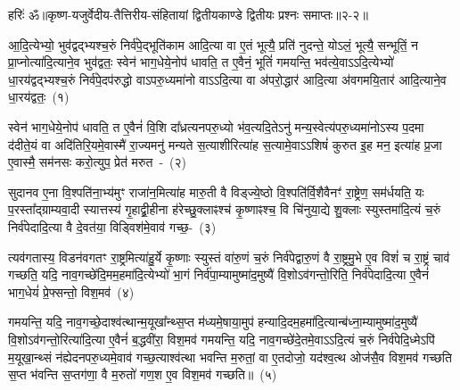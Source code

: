 {\anuvakamend[जि॒नोषि॑ देभुः॒ प्र ह॒व्यं ब॒भूथ॒ मा याभि॑श्चत्वारि॒ꣳ॒शच्च॑]}

{हरिः॑ ॐ}{॥कृष्ण-यजुर्वेदीय-तैत्तिरीय-संहितायां द्वितीयकाण्डे द्वितीयः प्रश्नः समाप्तः॥२-२॥}

\setcounter{anuvakam}{0}
आ॒दि॒त्येभ्यो॒ भुव॑द्वद्भ्यश्च॒रुं निर्व॑पे॒द्भूति॑काम आदि॒त्या वा ए॒तं भूत्यै॒ प्रति॑ नुदन्ते॒ यो\-ऽलं॒ भूत्यै॒ सन्भूतिं॒ न प्रा॒प्नोत्या॑दि॒त्याने॒व भुव॑द्वतः॒ स्वेन॑ भाग॒धेये॒नोप॑ धावति॒ त ए॒वैनं॒ भूतिं॑ गमयन्ति॒ भव॑त्ये॒वा\-ऽऽ\-दि॒त्येभ्यो॑ धा॒रय॑द्वद्भ्यश्च॒रुं निर्व॑पे॒दप॑रुद्धो वा\-ऽपरु॒ध्यमा॑नो वा\-ऽऽ\-दि॒त्या वा अ॑परो॒द्धार॑ आदि॒त्या अ॑वगमयि॒तार॑ आदि॒त्याने॒व धा॒रय॑द्वतः॒~(१)\ip

स्वेन॑ भाग॒धेये॒नोप॑ धावति॒ त ए॒वैनं॑ वि॒शि दा᳚ध्रत्यनपरु॒ध्यो भ॑व॒त्यदि॒ते\-ऽनु॑ मन्य॒स्वेत्य॑परु॒ध्यमा॑नो\-ऽस्य प॒दमा द॑दीते॒यं वा अदि॑तिरि॒यमे॒वास्मै॑ रा॒ज्यमनु॑ मन्यते स॒त्याशीरित्या॑ह स॒त्यामे॒वा\-ऽऽ\-शिषं॑ कुरुत इ॒ह मन॒ इत्या॑ह प्र॒जा ए॒वास्मै॒ सम॑नसः करो॒त्युप॒ प्रेत॑ मरुत~-~(२)\ip

सुदानव ए॒ना वि॒श्पति॑ना॒भ्य॑मुꣳ राजा॑न॒मित्या॑ह मारु॒ती वै विड्ज्ये॒ष्ठो वि॒श्पति॑र्वि॒शैवैनꣳ॑ रा॒ष्ट्रेण॒ सम॑र्धयति॒ यः प॒रस्ता᳚द्ग्राम्यवा॒दी स्यात्तस्य॑ गृ॒हाद्व्री॒हीना ह॑रेच्छु॒क्लाꣴश्च॑ कृ॒ष्णाꣴश्च॒ वि चि॑नुया॒द्ये शु॒क्लाः स्युस्तमा॑दि॒त्यं च॒रुं निर्व॑पेदादि॒त्या वै दे॒वत॑या॒ विड्विश॑मे॒वाव॑ \mbox{गच्छ॒-~(३)\ip}

त्यव॑गतास्य॒ विडन॑वगतꣳ रा॒ष्ट्रमित्या॑हु॒र्ये कृ॒ष्णाः स्युस्तं वा॑रु॒णं च॒रुं निर्व॑पेद्वारु॒णं वै रा॒ष्ट्रमु॒भे ए॒व विशं॑ च रा॒ष्ट्रं चाव॑ गच्छति॒ यदि॒ नाव॒गच्छे॑दि॒मम॒हमा॑दि॒त्येभ्यो॑ भा॒गं निर्व॑पा॒म्यामुष्मा॑द॒मुष्यै॑ वि॒शो\-ऽव॑गन्तो॒रिति॒ निर्व॑पेदादि॒त्या ए॒वैनं॑ भाग॒धेयं॑ प्रे॒फ्सन्तो॒ विश॒मव॑~(४)\ip

गमयन्ति॒ यदि॒ नाव॒गच्छे॒दाश्व॑त्थान्म॒यूखा᳚न्थ्स॒प्त म॑ध्यमे॒षाया॒मुप॑ हन्या\-दि॒द\-म॒हमा॑\-दि॒त्यान्ब॑ध्ना॒म्यामुष्मा॑\-द॒मुष्यै॑ वि॒शो\-ऽव॑गन्तो॒रित्या॑\-दि॒त्या ए॒वैनं॑ ब॒द्धवी॑रा॒ विश॒मव॑ गमयन्ति॒ यदि॒ नाव॒गच्छे॑दे॒तमे॒वा\-ऽऽ\-दि॒त्यं च॒रुं निर्व॑पेदि॒ध्मे\-ऽपि॑ म॒यूखा॒न्थ्सं न॑ह्येदनपरु॒ध्यमे॒वाव॑ गच्छ॒त्याश्व॑त्था भवन्ति म॒रुतां॒ वा ए॒तदोजो॒ यद॑श्व॒त्थ ओज॑सै॒व विश॒मव॑ गच्छति स॒प्त भ॑वन्ति स॒प्तग॑णा॒ वै म॒रुतो॑ गण॒श ए॒व विश॒मव॑ गच्छति॥~(५)\ip

